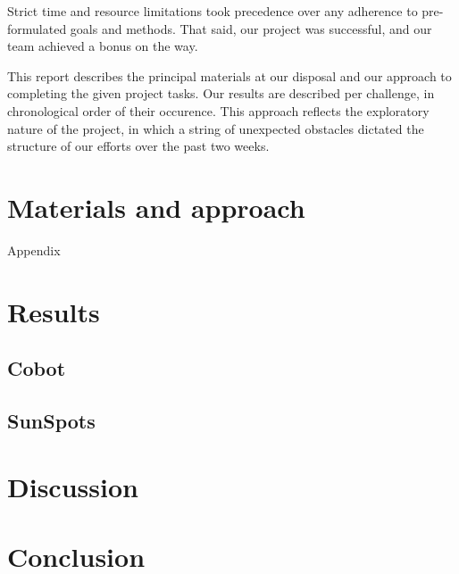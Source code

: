 \documentclass[a4paper, 12pt, titlepage]{article}
\begin{document}
Strict time and resource limitations took precedence over any adherence
to pre-formulated goals and methods. That said, our project was successful,
and our team achieved a bonus on the way.

This report describes the principal materials at our disposal and our approach
to completing the given project tasks. Our results are described per
challenge, in chronological order of their occurence. 
This approach reflects the exploratory
nature of the project, in which a string of unexpected obstacles dictated 
the structure of our efforts over the past two weeks. 

\section{Materials and approach}
Appendix 

\section{Results}

\subsection{Cobot}

\subsection{SunSpots}

\section{Discussion}

\section{Conclusion}

\Appendix



\end{document}
